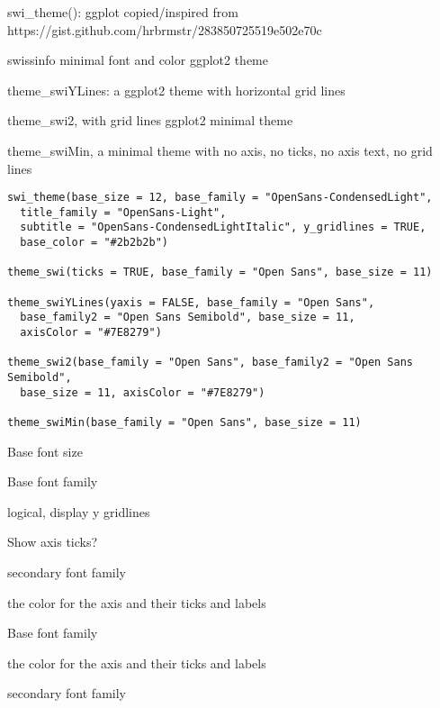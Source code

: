 \documentclass[a4paper]{book}
\begin{document}
%
\begin{Description}\relax
swi\_theme(): ggplot copied/inspired from https://gist.github.com/hrbrmstr/283850725519e502e70c

swissinfo minimal font and color ggplot2 theme

theme\_swiYLines: a ggplot2 theme with horizontal grid lines

theme\_swi2, with grid lines ggplot2 minimal theme

theme\_swiMin, a minimal theme with no axis, no ticks, no axis text, no grid lines
\end{Description}
%
\begin{Usage}
\begin{verbatim}
swi_theme(base_size = 12, base_family = "OpenSans-CondensedLight",
  title_family = "OpenSans-Light",
  subtitle = "OpenSans-CondensedLightItalic", y_gridlines = TRUE,
  base_color = "#2b2b2b")

theme_swi(ticks = TRUE, base_family = "Open Sans", base_size = 11)

theme_swiYLines(yaxis = FALSE, base_family = "Open Sans",
  base_family2 = "Open Sans Semibold", base_size = 11,
  axisColor = "#7E8279")

theme_swi2(base_family = "Open Sans", base_family2 = "Open Sans Semibold",
  base_size = 11, axisColor = "#7E8279")

theme_swiMin(base_family = "Open Sans", base_size = 11)
\end{verbatim}
\end{Usage}
%
\begin{Arguments}
\begin{ldescription}
\item[\code{base\_size}] Base font size

\item[\code{base\_family}] Base font family

\item[\code{y\_gridlines}] logical, display y gridlines

\item[\code{ticks}]  Show axis ticks?

\item[\code{base\_family2}] secondary font family

\item[\code{axisColor}] the color for the axis and their ticks and labels

\item[\code{base\_family}] Base font family

\item[\code{axisColor}] the color for the axis and their ticks and labels

\item[\code{base\_family2}] secondary font family
\end{ldescription}
\end{Arguments}
\end{document}
